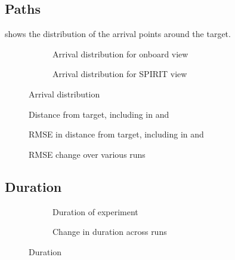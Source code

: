   \subsection{Paths}
   shows the distribution of the arrival points around the target.

  \begin{figure}[h]
    \centering
    \begin{subfigure}[b]{0.45\textwidth}
      \ifdraft{}{}
      \label{fig:distribution_onboard}
      \caption{Arrival distribution for onboard view}
    \end{subfigure}
    \hfill
    \begin{subfigure}[b]{0.45\textwidth}
      \ifdraft{}{}
      \label{fig:distribution_spirit}
      \caption{Arrival distribution for SPIRIT view}
    \end{subfigure}
    \label{fig:distribution}
    \caption{Arrival distribution}
  \end{figure}

  \begin{figure}[h]
    \centering
    \ifdraft{}{}
    \label{fig:distance}
    \caption{Distance from target, including in  and }
  \end{figure}

  \begin{figure}[h]
    \centering
    \ifdraft{}{}
    \label{fig:rms}
    \caption{RMSE in distance from target, including in  and }
  \end{figure}

  \begin{figure}[h]
    \centering
    \ifdraft{}{}
    \label{fig:rms_runs}
    \caption{RMSE change over various runs}
  \end{figure}

  \subsection{Duration}
  \begin{figure}[h]
    \centering
    \begin{subfigure}[b]{0.45\textwidth}
      \ifdraft{}{}
      \label{fig:duration_result}
      \caption{Duration of experiment}
    \end{subfigure}
    \hfill
    \begin{subfigure}[b]{0.45\textwidth}
      \ifdraft{}{}
      \label{fig:duration_runs}
      \caption{Change in duration across runs}
    \end{subfigure}
    \label{fig:duration}
    \caption{Duration}
  \end{figure}


